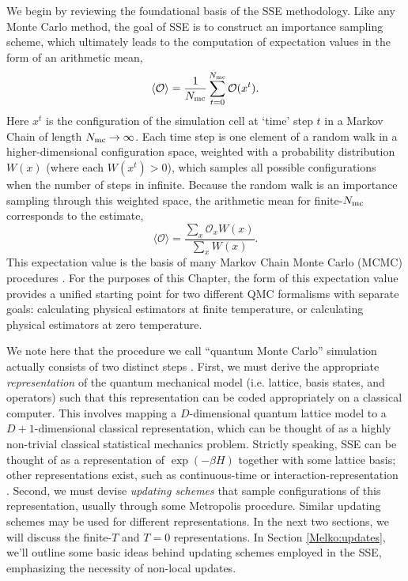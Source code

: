 \documentclass[vecphys]{svmult}
\begin{document}
We begin by reviewing the foundational basis of the SSE methodology.  Like any Monte Carlo method, the goal of SSE is to construct an importance sampling scheme, which ultimately leads to the computation of expectation values in the form of an arithmetic mean,
\begin{equation}
\langle \mathcal{O} \rangle  = \frac{1}{N_{\rm mc}} \sum_{t=0}^{N_{\rm mc}} \mathcal{O}(x^t). \label{est1}
\end{equation}
Here $x^t$ is the configuration of the simulation cell at \lq time' step $t$ in a Markov Chain of length $N_{\rm mc} \rightarrow \infty$.
Each time step is one element of a random walk in a higher-dimensional configuration space, weighted with a probability distribution $W(x)$ (where each $W(x^t) > 0$), which samples all possible configurations when the number of steps in infinite.
Because the random walk is an importance sampling through this weighted space, the arithmetic mean for finite-$N_{\rm mc}$ corresponds to the estimate,
\begin{equation}
\langle \mathcal{O} \rangle  = \frac{\sum_x \mathcal{O}_x  W(x)}{\sum_x W(x)}. \label{est2}
\end{equation}
This expectation value is the basis of many Markov Chain Monte Carlo (MCMC) procedures \cite{Melko:Liu}.
For the purposes of this Chapter, the form of this expectation value provides a unified starting point
for two different QMC formalisms with separate goals: calculating physical estimators at finite temperature, or calculating physical estimators at zero temperature.  

We note here that the procedure we call ``quantum Monte Carlo'' simulation actually consists of two distinct steps \cite{Melko:Assaad07}.  First, we must derive the appropriate {\it representation} of the quantum mechanical model (i.e. lattice, basis states, and operators) such that this representation can be coded appropriately on a classical computer.
This involves mapping a $D$-dimensional quantum lattice model to a $D+1$-dimensional classical representation, which can be thought of as a highly non-trivial classical statistical mechanics problem.
Strictly speaking, SSE can be thought of as a representation of $\exp(-\beta H)$ together with some lattice basis; other representations exist, such as continuous-time or interaction-representation \cite{Melko:Assaad07}.
Second, we must devise {\it updating schemes} that sample configurations of this representation, usually through some Metropolis procedure.  Similar updating schemes may be used for different representations.
In the next two sections, we will discuss the finite-$T$ and $T=0$ representations.  In Section \ref{Melko:updates}, we'll outline some basic ideas behind updating schemes employed in the SSE, emphasizing the necessity of non-local updates.  
\end{document}
